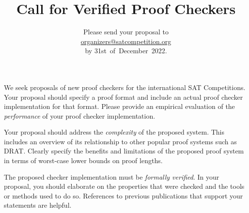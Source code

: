 \documentclass{article}
\title{Call for Verified Proof Checkers}
\author{Please send your proposal to\\[.3em] \mbox{\url{organizers@satcompetition.org}}\\[.3em] by 31st~of~December~2022.}
\date{}
\begin{document}
\maketitle
\thispagestyle{empty}


We seek proposals of new proof checkers for the international SAT Competitions. 
Your proposal should specify a proof format and include an actual proof checker implementation for that format.
Please provide an empirical evaluation of the \emph{performance} of your proof checker implementation.

Your proposal should address the \emph{complexity} of the proposed system. 
This includes an overview of its relationship to other popular proof systems such as DRAT. %
Clearly specify the benefits and limitations of the proposed proof system in terms of worst-case lower bounds on proof lengths. 

The proposed checker implementation must be \emph{formally verified}. 
In your proposal, you should elaborate on the properties that were checked and the tools or methods used to do so.
References to previous publications that support your statements are helpful. 





%
\end{document}

